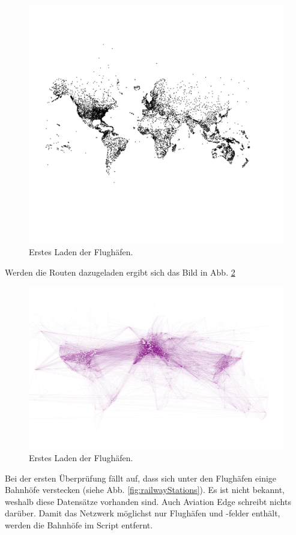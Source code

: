 \begin{figure}[h]
    \centering
    \includegraphics[width=\linewidth]{images/first-load-gephi.png}
    \caption{Erstes Laden der Flughäfen.}
    \label{fig:firstLoadGephi}
\end{figure}

Werden die Routen dazugeladen ergibt sich das Bild in Abb. \ref{fig:firstLoadGephiRoutes}

\begin{figure}
    \centering
    \includegraphics[width=\linewidth]{images/first-load-gephi-routes.png}
    \caption{Erstes Laden der Flughäfen.}
    \label{fig:firstLoadGephiRoutes}
\end{figure}

Bei der ersten Überprüfung fällt auf, dass sich unter den Flughäfen einige Bahnhöfe verstecken (siehe Abb. \ref{fig:railwayStations}).
Es ist nicht bekannt, weshalb diese Datensätze vorhanden sind.
Auch Aviation Edge schreibt nichts darüber.
Damit das Netzwerk möglichst nur Flughäfen und -felder enthält, werden die Bahnhöfe im Script entfernt.

